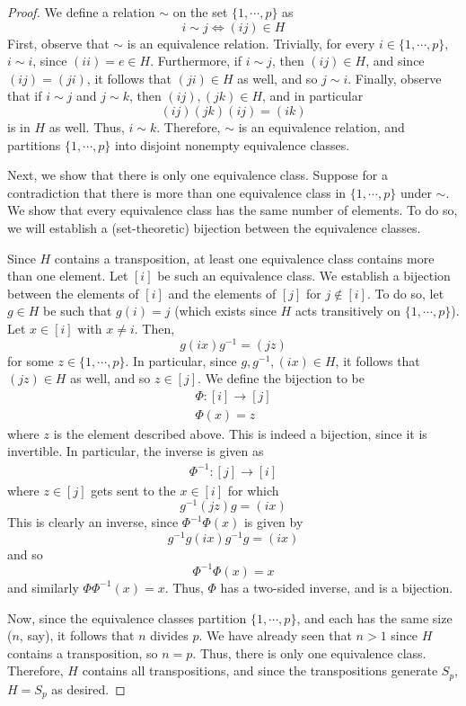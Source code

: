 \documentclass[12pt,reqno]{amsart}
\begin{document}
\begin{proof}
    We define a relation $\sim$ on the set $\{1,\cdots,p\}$ as
    \[
        i\sim j \iff (ij)\in H
    \]
    First, observe that $\sim$ is an equivalence relation. Trivially, for every
    $i\in \{1,\cdots,p\}$, $i\sim i$, since $(ii) = e\in H$. Furthermore, if
    $i\sim j$, then $(ij)\in H$, and since $(ij)=(ji)$, it follows that $(ji)\in
    H$ as well, and so $j\sim i$.
    Finally, observe that if $i\sim j$ and $j\sim k$, then $(ij),(jk)\in H$, and
    in particular
    \[
        (ij)(jk)(ij) = (ik)
    \]
    is in $H$ as well. Thus, $i\sim k$. Therefore, $\sim$ is an equivalence
    relation, and partitions $\{1,\cdots,p\}$ into disjoint nonempty equivalence
    classes.

    Next, we show that there is only one equivalence class. Suppose for a
    contradiction that there is more than one equivalence class in
    $\{1,\cdots,p\}$ under $\sim$.  We show that every equivalence class has the
    same number of elements.  To do so, we will establish a (set-theoretic)
    bijection between the equivalence classes.

    Since $H$ contains a transposition, at least one equivalence class contains
    more than one element. Let $[i]$ be such an equivalence class. We establish
    a bijection between the elements of $[i]$ and the elements of $[j]$ for
    $j\not\in [i]$. To do so, let $g\in H$ be such that $g(i)=j$ (which exists
    since $H$ acts transitively on $\{1,\cdots,p\}$). Let $x\in [i]$ with $x\neq
    i$. Then,
    \[
        g(ix)g^{-1} = (jz)
    \]
    for some $z\in \{1,\cdots,p\}$. In particular, since $g,g^{-1},(ix)\in H$,
    it follows that $(jz)\in H$ as well, and so $z\in[j]$. We define the
    bijection to be
    \[
        \begin{aligned}
        \Phi:[i]\to [j]\\
        \Phi(x) = z
    \end{aligned}
    \]
    where $z$ is the element described above. This is indeed a bijection, since
    it is invertible. In particular, the inverse is given as
    \[
\begin{aligned}
    \Phi^{-1}:[j]\to [i]
\end{aligned}
    \]
    where $z\in [j]$ gets sent to the $x\in [i]$ for which
    \[
        g^{-1}(jz)g = (ix)
    \]
    This is clearly an inverse, since $\Phi^{-1}\Phi(x)$
    is given by
    \[
        g^{-1}g(ix)g^{-1}g = (ix)
    \]
    and so
    \[
        \Phi^{-1}\Phi(x) = x
    \]
    and similarly $\Phi\Phi^{-1}(x) = x$. Thus, $\Phi$ has a two-sided inverse,
    and is a bijection.

    Now, since the equivalence classes partition $\{1,\cdots,p\}$, and each has
    the same size ($n$, say), it follows that $n$ divides $p$. We have already
    seen that $n>1$ since $H$ contains a transposition, so $n=p$. Thus, there is
    only one equivalence class. Therefore, $H$ contains all transpositions, and
    since the transpositions generate $S_p$, $H=S_p$ as desired.
\end{proof}
\end{document}

